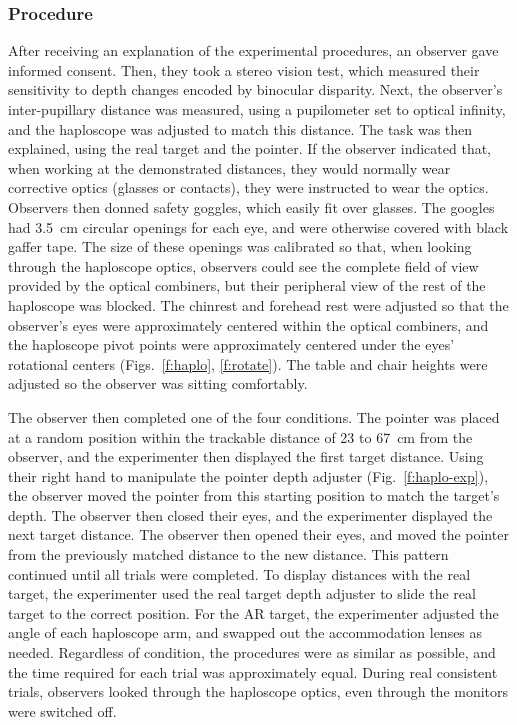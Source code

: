 \documentclass[10pt,journal,compsoc]{IEEEtran}
\begin{document}
\subsubsection {Procedure}

After receiving an explanation of the experimental procedures, an observer gave informed consent.  Then, they took a stereo vision test, which measured their sensitivity to depth changes encoded by binocular disparity.  Next, the observer's inter-pupillary distance was measured, using a pupilometer set to optical infinity, and the haploscope was adjusted to match this distance.  The task was then explained, using the real target and the pointer.  If the observer indicated that, when working at the demonstrated distances, they would normally wear corrective optics (glasses or contacts), they were instructed to wear the optics.  Observers then donned safety goggles, which easily fit over glasses.  The googles had 3.5~cm circular openings for each eye, and were otherwise covered with black gaffer tape.  The size of these openings was calibrated so that, when looking through the haploscope optics, observers could see the complete field of view provided by the optical combiners, but their peripheral view of the rest of the haploscope was blocked.  The chinrest and forehead rest were adjusted so that the observer's eyes were approximately centered within the optical combiners, and the haploscope pivot points were approximately centered under the eyes' rotational centers (Figs.~\ref{f:haplo}, \ref{f:rotate}).  The table and chair heights were adjusted so the observer was sitting comfortably.  


The observer then completed one of the four conditions.  The pointer was placed at a random position within the trackable distance of 23 to 67~cm from the observer, and the experimenter then displayed the first target distance.  Using their right hand to manipulate the pointer depth adjuster (Fig.~\ref{f:haplo-exp}), the observer moved the pointer from this starting position to match the target's depth.  The observer then closed their eyes, and the experimenter displayed the next target distance.  The observer then opened their eyes, and moved the pointer from the previously matched distance to the new distance.  This pattern continued until all trials were completed.  To display distances with the real target, the experimenter used the real target depth adjuster to slide the real target to the correct position.  For the AR target, the experimenter adjusted the angle of each haploscope arm, and swapped out the accommodation lenses as needed.  Regardless of condition, the procedures were as similar as possible, and the time required for each trial was approximately equal.  During real consistent trials, observers looked through the haploscope optics, even through the monitors were switched off.  
\end{document}
